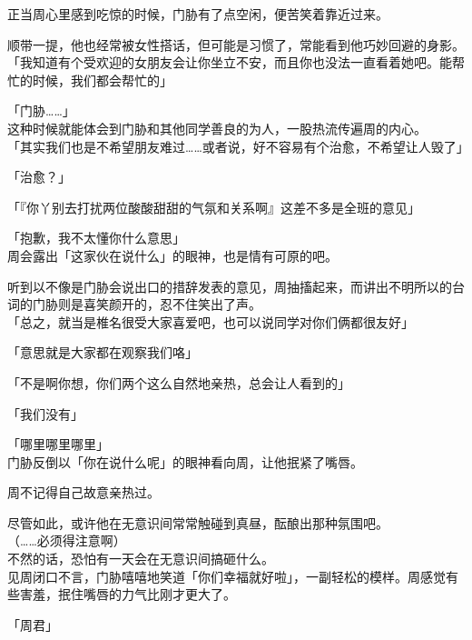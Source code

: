 正当周心里感到吃惊的时候，门胁有了点空闲，便苦笑着靠近过来。

顺带一提，他也经常被女性搭话，但可能是习惯了，常能看到他巧妙回避的身影。\\

「我知道有个受欢迎的女朋友会让你坐立不安，而且你也没法一直看着她吧。能帮忙的时候，我们都会帮忙的」

「门胁……」\\

这种时候就能体会到门胁和其他同学善良的为人，一股热流传遍周的内心。\\

「其实我们也是不希望朋友难过……或者说，好不容易有个治愈，不希望让人毁了」

「治愈？」

「『你丫别去打扰两位酸酸甜甜的气氛和关系啊』这差不多是全班的意见」

「抱歉，我不太懂你什么意思」\\

周会露出「这家伙在说什么」的眼神，也是情有可原的吧。

听到以不像是门胁会说出口的措辞发表的意见，周抽搐起来，而讲出不明所以的台词的门胁则是喜笑颜开的，忍不住笑出了声。\\

「总之，就当是椎名很受大家喜爱吧，也可以说同学对你们俩都很友好」

「意思就是大家都在观察我们咯」

「不是啊你想，你们两个这么自然地亲热，总会让人看到的」

「我们没有」

「哪里哪里哪里」\\

门胁反倒以「你在说什么呢」的眼神看向周，让他抿紧了嘴唇。

周不记得自己故意亲热过。

尽管如此，或许他在无意识间常常触碰到真昼，酝酿出那种氛围吧。\\

（……必须得注意啊）\\

不然的话，恐怕有一天会在无意识间搞砸什么。\\

见周闭口不言，门胁嘻嘻地笑道「你们幸福就好啦」，一副轻松的模样。周感觉有些害羞，抿住嘴唇的力气比刚才更大了。\\

\vspace{2\baselineskip}

「周君」\\

